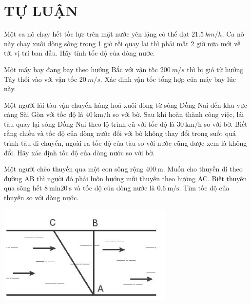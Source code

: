 \section{TỰ LUẬN}
\setcounter{ex}{0}
\begin{ex}
Một ca nô chạy hết tốc lực trên mặt nước yên lặng có thể đạt $\SI{21,5}{km/h}$. Ca nô này chạy xuôi dòng sông trong 1 giờ rồi quay lại thì phải mất 2 giờ nữa mới về tới vị trí ban đầu. Hãy tính tốc độ của dòng nước.	
\end{ex}
\begin{ex}
	Một máy bay đang bay theo hướng Bắc với vận tốc $\SI{200}{m/s}$ thì bị gió từ hướng Tây thổi vào với vận tốc $\SI{20}{m/s}$. Xác định vận tốc tổng hợp của máy bay lúc này.
	\loigiai{}
\end{ex}
\begin{ex}
	Một người lái tàu vận chuyển hàng hoá xuôi dòng từ sông Đồng Nai đến khu vực cảng Sài Gòn với tốc độ là $\SI{40}{\kilo\meter/\hour}$ so với bờ. Sau khi hoàn thành công việc, lái tàu quay lại sông Đồng Nai theo lộ trình cũ với tốc độ là $\SI{30}{\kilo\meter/\hour}$ so với bờ. Biết rằng chiều và tốc độ của dòng nước đối với bờ không thay đổi trong suốt quá trình tàu di chuyển, ngoài ra tốc độ của tàu so với nước cũng được xem là không đổi. Hãy xác định tốc độ của dòng nước so với bờ.
\end{ex}
\begin{ex}
	Một người chèo thuyền qua một con sông rộng $\SI{400}{\meter}$. Muốn cho thuyền đi theo đường AB thì người đó phải luôn hướng mũi thuyền theo hướng AC. Biết thuyền qua sông hết $\SI{8}{\minute} \SI{20}{\second}$ và tốc độ của dòng nước là $\SI{0.6}{\meter/\second}$. Tìm tốc độ của thuyền so với dòng nước.
	\begin{center}
		\includegraphics[width=0.35\linewidth]{figs/BAI5-1}
	\end{center}
\end{ex}
